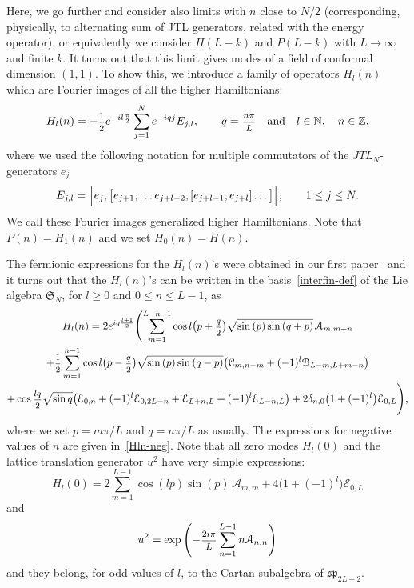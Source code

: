 \documentclass[11pt]{article}
\newcommand{\ffrac}[2]{\mbox{\footnotesize$\displaystyle\frac{#1}{#2}$}}
\newcommand{\JTL}[1]{JTL_{#1}}
\newcommand{\half}{%
  \mathchoice{\ffrac{1}{2}}{\frac{1}{2}}{\frac{1}{2}}{\frac{1}{2}}}
\newcommand{\oN}{\mathbb{N}}
\newcommand{\oZ}{\mathbb{Z}}
\newcommand{\interLie}{\mathfrak{S}}
\newcommand{\interfin}[1]{\interLie_{#1}}
\newcommand{\Asp}{\mathcal{A}}
\newcommand{\Bsp}{\mathcal{B}}
\newcommand{\Csp}{\mathcal{C}}
\newcommand{\Egl}{\mathcal{E}}
\newcommand{\ssp}{\mathfrak{sp}}
\theoremstyle{definition}
\begin{document}
Here, we go  further and consider also limits
with $n$ close to $N/2$ (corresponding, physically, to alternating sum of JTL generators, related with the energy operator), or equivalently we consider $H(L-k)$ and
$P(L-k)$ with $L\to\infty$ and finite $k$. It turns out that this limit
gives modes of
a field of conformal dimension $(1,1)$.
To show this,
we introduce a family  of operators $H_l(n)$ which are
Fourier images of all the higher Hamiltonians:
\begin{equation}\label{hham-def}
H_l(n) = -\half e^{-il\frac{\pi}{2}}\sum_{j=1}^Ne^{-iqj}E_{j,l},\qquad q=\ffrac{n\pi}{L} \quad\text{and}\quad l\in\oN,\quad n\in\oZ,
\end{equation}
where we used the following notation for  multiple
commutators of the $\JTL{N}$-generators $e_j$
\begin{equation}
E_{j,l} = \Bigl[e_j,\bigl[e_{j+1},\dots
 e_{j+l-2},[e_{j+l-1},e_{j+l}]\dots\bigl]\Bigl], \qquad 1\leq j\leq N.
\end{equation}
We call these Fourier images  generalized higher Hamiltonians. Note that $P(n)=H_1(n)$ and we set $H_0(n)=H(n)$.

The fermionic expressions for the $H_l(n)$'s were obtained in our first paper~\cite[Sec.~4.5.1]{GRS1} and
it turns out that the $H_l(n)$'s can be written in the basis~\eqref{interfin-def} of the Lie algebra $\interfin{N}$, for $l\geq0$
and $0\leq n\leq L-1$, as
\begin{multline}\label{Hln-pos}
H_l(n) =
2e^{iq\frac{l+1}{2}}\Biggl( \sum_{m=1}^{L-n-1}
\cos{l\bigl(p+\ffrac{q}{2}\bigr)}\sqrt{\sin{(p)}\sin{(q+p)}}\, \Asp_{m,m+n}\\
+\half\sum_{m=1}^{n-1}
\cos{l\bigl(p-\ffrac{q}{2}\bigr)}\sqrt{\sin{(p)}\sin{(q-p)}}\bigl(\Csp_{m,n-m}
+(-1)^l \Bsp_{L-m,L+m-n}\bigr)\\
+\cos{\ffrac{lq}{2}}\sqrt{\sin{q}}\bigl(\Egl_{0,n} +(-1)^l \Egl_{0,2L-n} + \Egl_{L+n,L} +
 (-1)^l\Egl_{L-n,L} \bigr) +
2\delta_{n,0}\bigl(1+(-1)^l\bigr)\Egl_{0,L} \Biggr),
\end{multline}
where we set $p=m\pi/L$ and $q=n\pi/L$ as usually. The expressions for negative values of $n$ are given in~\eqref{Hln-neg}.
Note that all zero modes $H_l(0)$ and the lattice translation
generator $u^2$  have very simple expressions:
\begin{equation}\label{hamilt-sp}
H_l(0) = 2\sum_{m=1}^{L-1}
\cos{(lp)}\sin{(p)}\, \Asp_{m,m} + 4\bigl(1+(-1)^l\bigr)\Egl_{0,L}
\end{equation}
and
\begin{equation}
u^2 = \exp\left(-\ffrac{2i\pi}{L}\sum_{n=1}^{L-1}n\Asp_{n,n}\right)
\end{equation}
and they belong, for odd values of $l$, to the Cartan
subalgebra of $\ssp_{2L-2}$.
\end{document}
